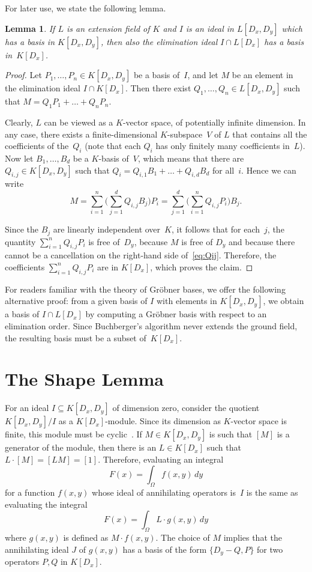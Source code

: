 \documentclass[a4paper,draft]{amsart}
\newtheorem{lem}[thm]{Lemma}
\begin{document}
For later use, we state the following lemma.

\begin{lem}\label{lem:elim}
  If $L$ is an extension field of $K$ and $I$ is an ideal in $L[D_x,D_y]$
  which has a basis in $K[D_x,D_y]$, then also the elimination ideal
  $I \cap L[D_x]$ has a basis in~$K[D_x]$.
\end{lem}
\begin{proof}
  Let $P_1,\dots,P_n\in K[D_x,D_y]$ be a basis of~$I$, and let $M$
  be an element in the elimination ideal $I\cap K[D_x]$. Then there
  exist $Q_1,\dots,Q_n\in L[D_x,D_y]$ such that $M=Q_1P_1+\dots+Q_nP_n$.

  Clearly, $L$ can be viewed as a $K$-vector space, of potentially
  infinite dimension. In any case, there exists a finite-dimensional
  $K$-subspace~$V$ of $L$ that contains all the coefficients of the~$Q_i$
  (note that each $Q_i$ has only finitely many coefficients in~$L$).
  Now let $B_1,\dots,B_d$ be a $K$-basis of~$V$, which means that
  there are $Q_{i,j}\in K[D_x,D_y]$ such that
  $Q_i=Q_{i,1}B_1+\dots+Q_{i,d}B_d$ for all~$i$. Hence we can write
  \begin{equation}\label{eq:Qij}
    M = \sum_{i=1}^n\biggl(\sum_{j=1}^d Q_{i,j}B_j\biggr)P_i
      = \sum_{j=1}^d\biggl(\sum_{i=1}^n Q_{i,j}P_i\biggr)B_j.
  \end{equation}

  Since the $B_j$ are linearly independent over~$K$, it follows that for
  each~$j$, the quantity $\sum_{i=1}^n Q_{i,j}P_i$ is free of~$D_y$, because
  $M$ is free of $D_y$ and because there cannot be a cancellation on the
  right-hand side of~\eqref{eq:Qij}. Therefore, the coefficients
  $\sum_{i=1}^n Q_{i,j}P_i$ are in $K[D_x]$, which proves the claim.
\end{proof}

For readers familiar with the theory of Gr\"obner bases, we offer the
following alternative proof: from a given basis of $I$ with elements
in $K[D_x,D_y]$, we obtain a basis of $I\cap L[D_x]$ by computing a
Gr\"obner basis with respect to an elimination order. Since Buchberger's
algorithm never extends the ground field, the resulting basis must
be a subset of~$K[D_x]$.

\section{The Shape Lemma}

For an ideal $I\subseteq K[D_x,D_y]$ of dimension zero, consider the
quotient $K[D_x,D_y]/I$ as a $K[D_x]$-module. Since its dimension
as $K$-vector space is finite, this module must be cyclic~\cite[Prop. 2.9]{put03}.
If $M\in K[D_x,D_y]$ is such that $[M]$ is a generator of the module,
then there is an $L\in K[D_x]$ such that $L\cdot [M]=[LM]=[1]$.
Therefore, evaluating an integral
\[
  F(x)=\int_\Omega f(x,y)\,dy
\]
for a function $f(x,y)$ whose ideal of annihilating operators is~$I$ is the
same as evaluating the integral
\[
  F(x)=\int_\Omega L\cdot g(x,y)\,dy
\]
where $g(x,y)$ is defined as $M\cdot f(x,y)$. The choice of $M$ implies %
that the annihilating ideal $J$ of $g(x,y)$ has a basis of the form $\{D_y - Q, P\}$
for two operators $P,Q$ in $K[D_x]$.
\end{document}
